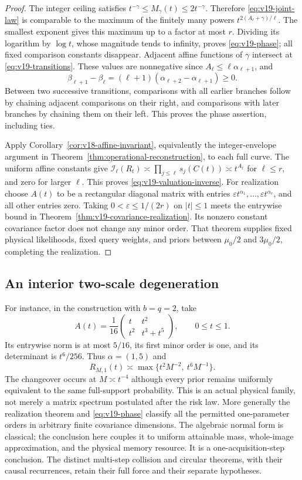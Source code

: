 \documentclass[11pt]{amsart}
\theoremstyle{definition}\newtheorem{definition}[theorem]{Definition}
\theoremstyle{remark}\newtheorem{remark}[theorem]{Remark}
\begin{document}
\begin{proof}
The integer ceiling satisfies $t^{-\gamma}\le M_\gamma(t)
\le2t^{-\gamma}$. Therefore \eqref{eq:v19-joint-law} is comparable
to the maximum of the finitely many powers
$t^{2(A_\ell+\gamma)/\ell}$. The smallest exponent gives this
maximum up to a factor at most $r$. Dividing its logarithm by
$\log t$, whose magnitude tends to infinity, proves
\eqref{eq:v19-phase}; all fixed comparison constants disappear.
Adjacent affine functions of $\gamma$ intersect at
\eqref{eq:v19-transitions}. These values are nonnegative since
$A_\ell\le\ell\alpha_{\ell+1}$, and
\[
 \beta_{\ell+1}-\beta_\ell
       =(\ell+1)(\alpha_{\ell+2}-\alpha_{\ell+1})\ge0.
\]
Between two successive transitions, comparisons with all earlier
branches follow by chaining adjacent comparisons on their right,
and comparisons with later branches by chaining them on their left.
This proves the phase assertion, including ties.

Apply Corollary~\ref{cor:v18-affine-invariant}, equivalently the
integer-envelope argument in
Theorem~\ref{thm:operational-reconstruction}, to each full curve.
The uniform affine constants give
$\mathcal I_\ell(R_t)\asymp\prod_{j\le\ell}s_j(C(t))
\asymp t^{A_\ell}$ for $\ell\le r$, and zero for larger $\ell$.
This proves \eqref{eq:v19-valuation-inverse}. For realization choose
$A(t)$ to be a rectangular diagonal matrix with entries
$\varepsilon t^{\alpha_1},\ldots,\varepsilon t^{\alpha_r}$,
and all other entries zero. Taking $0<\varepsilon\le1/(2r)$
on $|t|\le1$ meets the entrywise bound in
Theorem~\ref{thm:v19-covariance-realization}. Its nonzero constant
covariance factor does not change any minor order. That theorem
supplies fixed physical likelihoods, fixed query weights, and priors
between $\mu_0/2$ and $3\mu_0/2$, completing the realization.
\end{proof}

\subsection{An interior two-scale degeneration}
For instance, in the construction with $b=q=2$, take
\[
 A(t)=\frac1{16}
 \begin{pmatrix}t&t^2\\t^2&t^3+t^5\end{pmatrix},
 \qquad 0\le t\le1.
\]
Its entrywise norm is at most $5/16$, its first minor order is one,
and its determinant is $t^6/256$. Thus $\alpha=(1,5)$ and
\[
 R_{M,1}(t)\asymp\max\{t^2M^{-2},\ t^6M^{-1}\}.
\]
The changeover occurs at $M\asymp t^{-4}$ although every prior
remains uniformly equivalent to the same full-support probability.
This is an actual physical family, not merely a matrix spectrum
postulated after the risk law. More generally the realization theorem
and \eqref{eq:v19-phase} classify all the permitted one-parameter
orders in arbitrary finite covariance dimensions. The algebraic
normal form is classical; the conclusion here couples it to uniform
attainable mass, whole-image approximation, and the physical memory
resource. It is a one-acquisition-step conclusion. The distinct
multi-step collision and circular theorems, with their causal
recurrences, retain their full force and their separate hypotheses.
\end{document}
